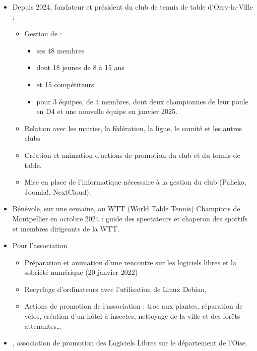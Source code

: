     \begin{itemize}
    	\item{Depuis 2024, fondateur et président du club de tennis de table d’Orry-la-Ville  :}
    	\begin{itemize}
    		\item{Gestion de :}
    		\begin{itemize}
    			\item{ses 48 membres}
    			\item{dont 18 jeunes de 8 à 15 ans}
    			\item{et 15 compétiteurs}
    			\item{pour 3 équipes, de 4 membres, dont deux championnes de leur poule en D4 et une nouvelle équipe en janvier 2025.}
    		\end{itemize}
    		\item{Relation avec les mairies, la fédération, la ligue, le comité et les autres clubs}
    		\item{Création et animation d’actions de promotion du club et du tennis de table.}
    		\item{Mise en place de l’informatique nécessaire à la gestion du club (Paheko, Joomla!, NextCloud).}
		\end{itemize}
		\item{Bénévole, sur une semaine, au WTT (World Table Tennis) Champions de Montpellier en octobre 2024 : guide des spectateurs et chaperon des sportifs et membres dirigeants de la WTT.}
		\item{Pour l'association }
            \begin{itemize}
                \item{Préparation et animation d'une rencontre sur les logiciels libres et la sobriété numérique (20 janvier 2022)}
                \item{Recyclage d'ordinateurs avec l'utilisation de Linux Debian,}
                \item{Actions de promotion de l'association : troc aux plantes, réparation de vélos, création d'un hôtel à insectes, nettoyage de la ville et des forêts attenantes\dots}
            \end{itemize}
        \item{, association de promotion des Logiciels Libres sur le département de l'Oise.}
            \begin{itemize}

\end{itemize}
\end{itemize}
